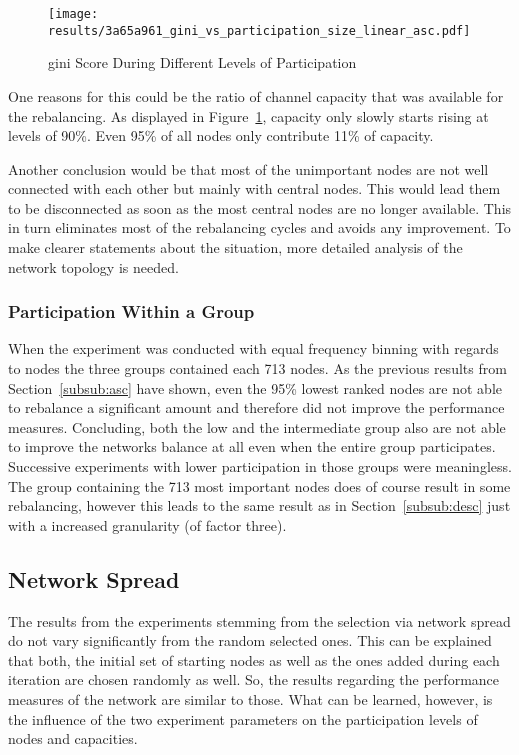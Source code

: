 \documentclass[final]{fhnwreport}       %
\begin{document}
\begin{figure}[htp]
\centering
\texttt{[image: results/3a65a961\_gini\_vs\_participation\_size\_linear\_asc.pdf]}
\caption{\gls{gini} Score During Different Levels of Participation}
\label{fig:gini_part_size_linear_asc}
\end{figure}

One reasons for this could be the ratio of channel capacity that was available for the rebalancing. As displayed in Figure~\ref{fig:gini_part_size_linear_asc}, capacity only slowly starts rising at levels of 90\%. Even 95\% of all nodes only contribute 11\% of capacity. 

Another conclusion would be that most of the unimportant nodes are not well connected with each other but mainly with central nodes. This would lead them to be disconnected as soon as the most central nodes are no longer available. This in turn eliminates most of the rebalancing cycles and avoids any improvement. To make clearer statements about the situation, more detailed analysis of the network topology is needed.

\subsubsection{Participation Within a Group}
When the experiment was conducted with equal frequency binning with regards to nodes the three groups contained each 713 nodes. As the previous results from Section~\ref{subsub:asc} have shown, even the 95\% lowest ranked nodes are not able to rebalance a significant amount and therefore did not improve the performance measures. Concluding, both the low and the intermediate group also are not able to improve the networks balance at all even when the entire group participates. Successive experiments with lower participation in those groups were meaningless. The group containing the 713 most important nodes does of course result in some rebalancing, however this leads to the same result as in Section~\ref{subsub:desc} just with a increased granularity (of factor three).

\subsection{Network Spread}
The results from the experiments stemming from the selection via network spread do not vary significantly from the random selected ones. This can be explained that both, the initial set of starting nodes as well as the ones added during each iteration are chosen randomly as well. So, the results regarding the performance measures of the network are similar to those. What can be learned, however, is the influence of the two experiment parameters on the participation levels of nodes and capacities.
\end{document}

